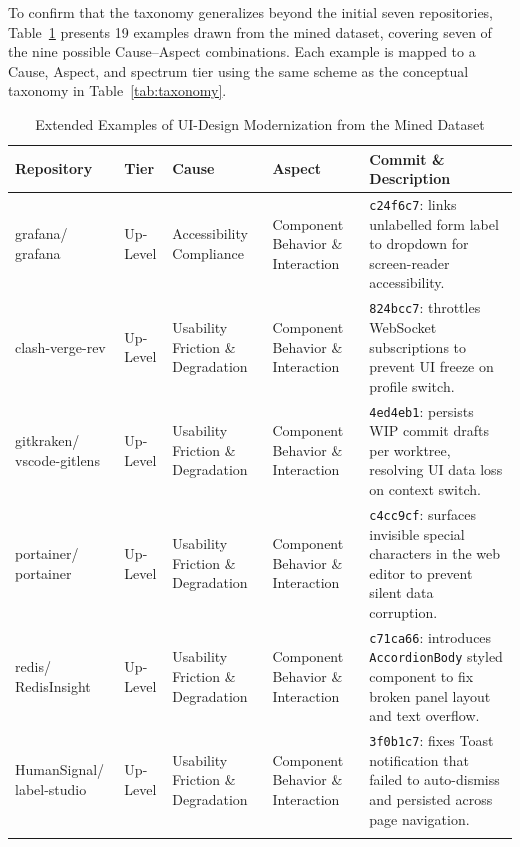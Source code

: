 \documentclass{article}
\begin{document}
To confirm that the taxonomy generalizes beyond the initial seven
repositories, Table~\ref{tab:extended_examples} presents 19 examples drawn
from the mined dataset, covering seven of the nine possible
Cause--Aspect combinations.
Each example is mapped to a Cause, Aspect, and spectrum tier using the
same scheme as the conceptual taxonomy in Table~\ref{tab:taxonomy}.

\begin{table}[H]
\centering
\caption{Extended Examples of UI-Design Modernization from the Mined Dataset}
\label{tab:extended_examples}
{\footnotesize
\begin{tabularx}{\textwidth}{p{1.8cm} p{1.5cm} p{2.3cm} p{2.3cm} X}
\toprule
\textbf{Repository} & \textbf{Tier} & \textbf{Cause} & \textbf{Aspect} & \textbf{Commit \& Description} \\
\midrule

grafana/ grafana & Up-Level & Accessibility Compliance & Component Behavior \& Interaction & \texttt{c24f6c7}: links unlabelled form label to dropdown for screen-reader accessibility. \cite{commit:grafana:a11y} \\
\addlinespace

clash-verge-rev & Up-Level & Usability Friction \& Degradation & Component Behavior \& Interaction & \texttt{824bcc7}: throttles WebSocket subscriptions to prevent UI freeze on profile switch. \cite{commit:clashverge:freeze}\\
\addlinespace

gitkraken/ vscode-gitlens & Up-Level & Usability Friction \& Degradation & Component Behavior \& Interaction & \texttt{4ed4eb1}: persists WIP commit drafts per worktree, resolving UI data loss on context switch. \cite{commit:gitlens:wip} \\
\addlinespace

portainer/ portainer & Up-Level & Usability Friction \& Degradation & Component Behavior \& Interaction & \texttt{c4cc9cf}: surfaces invisible special characters in the web editor to prevent silent data corruption. \cite{commit:portainer:invisible}\\
\addlinespace

redis/ RedisInsight & Up-Level & Usability Friction \& Degradation & Component Behavior \& Interaction & \texttt{c71ca66}: introduces \texttt{AccordionBody} styled component to fix broken panel layout and text overflow. \cite{commit:redisinsight:accordion}\\
\addlinespace

HumanSignal/ label-studio & Up-Level & Usability Friction \& Degradation & Component Behavior \& Interaction & \texttt{3f0b1c7}: fixes Toast notification that failed to auto-dismiss and persisted across page navigation. \cite{commit:labelstudio:toast}\\
\addlinespace


\end{tabularx}}
\end{table}
\end{document}
